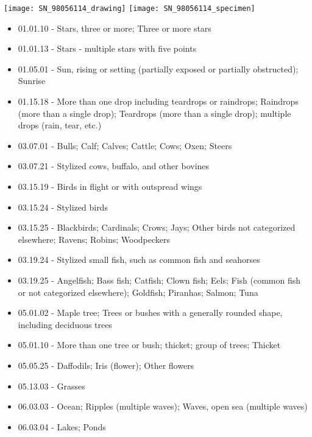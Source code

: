 \documentclass[aspectratio=1610]{beamer}
\begin{document}
\begin{frame}

\begin{minipage}{.5\textwidth}
\texttt{[image: SN\_98056114\_drawing]}
\texttt{[image: SN\_98056114\_specimen]}
\end{minipage}%
\begin{minipage}{.5\textwidth}

\begin{itemize}
\TINY

\item 01.01.10 - Stars, three or more; Three or more stars
\item 01.01.13 - Stars - multiple stars with five points
\item 01.05.01 - Sun, rising or setting (partially exposed or partially obstructed); Sunrise
\item 01.15.18 - More than one drop including teardrops or raindrops; Raindrops (more than a single drop); Teardrops (more than a single drop); multiple drops (rain, tear, etc.)
\item 03.07.01 - Bulls; Calf; Calves; Cattle; Cows; Oxen; Steers
\item 03.07.21 - Stylized cows, buffalo, and other bovines
\item 03.15.19 - Birds in flight or with outspread wings
\item 03.15.24 - Stylized birds
\item 03.15.25 - Blackbirds; Cardinals; Crows; Jays; Other birds not categorized elsewhere; Ravens; Robins; Woodpeckers
\item 03.19.24 - Stylized small fish, such as common fish and seahorses
\item 03.19.25 - Angelfish; Bass fish; Catfish; Clown fish; Eels; Fish (common fish or not categorized elsewhere); Goldfish; Piranhas; Salmon; Tuna
\item 05.01.02 - Maple tree; Trees or bushes with a generally rounded shape, including deciduous trees
\item 05.01.10 - More than one tree or bush; thicket; group of trees; Thicket
\item 05.05.25 - Daffodils; Iris (flower); Other flowers
\item 05.13.03 - Grasses
\item 06.03.03 - Ocean; Ripples (multiple waves); Waves, open sea (multiple waves)
\item 06.03.04 - Lakes; Ponds

\end{itemize}
\end{minipage}
\end{frame}
\end{document}
